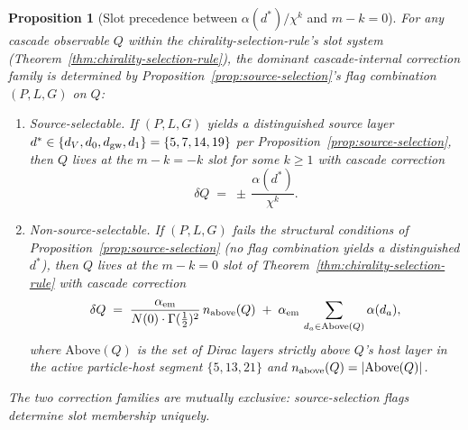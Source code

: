 \documentclass[12pt,a4paper]{article}
\newtheorem{proposition}[theorem]{Proposition}
\begin{document}
\begin{proposition}[Slot precedence between $\alpha(d^*)/\chi^k$ and $m{-}k = 0$]\label{prop:slot-precedence}
For any cascade observable $Q$ within the chirality-selection-rule's
slot system (Theorem~\ref{thm:chirality-selection-rule}), the
dominant cascade-internal correction family is determined by
Proposition~\ref{prop:source-selection}'s flag combination
$(P, L, G)$ on $Q$:
\begin{enumerate}[label=(\arabic*),nosep]
\item \emph{Source-selectable.} If $(P, L, G)$ yields a
distinguished source layer $d^* \in \{d_V, d_0, d_{\rm gw}, d_1\} =
\{5, 7, 14, 19\}$ per Proposition~\ref{prop:source-selection},
then $Q$ lives at the $m-k = -k$ slot for some $k \geq 1$ with
cascade correction
\[
\delta Q \;=\; \pm\,\frac{\alpha(d^*)}{\chi^k}.
\]
\item \emph{Non-source-selectable.} If $(P, L, G)$ fails the
structural conditions of Proposition~\ref{prop:source-selection}
(no flag combination yields a distinguished $d^*$), then $Q$
lives at the $m - k = 0$ slot of
Theorem~\ref{thm:chirality-selection-rule} with cascade correction
\[
\delta Q \;=\; \frac{\alpha_{\rm em}}{N(0)\cdot\Gamma(\tfrac{1}{2})^2}\,n_{\rm above}(Q)
\;+\; \alpha_{\rm em}\,\sum_{d_a \in \mathrm{Above}(Q)}\alpha(d_a),
\]
where $\mathrm{Above}(Q)$ is the set of Dirac layers strictly
above $Q$'s host layer in the active particle-host segment
$\{5, 13, 21\}$ and
$n_{\rm above}(Q) = |\mathrm{Above}(Q)|$.
\end{enumerate}
The two correction families are mutually exclusive: source-selection
flags determine slot membership uniquely.
\end{proposition}
\end{document}
